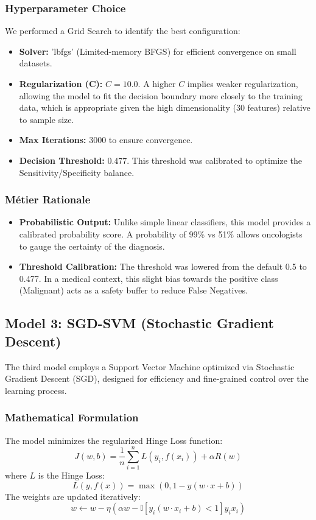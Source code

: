 \subsubsection{Hyperparameter Choice}
We performed a Grid Search to identify the best configuration:
\begin{itemize}
    \item \textbf{Solver:} 'lbfgs' (Limited-memory BFGS) for efficient convergence on small datasets.
    \item \textbf{Regularization (C):} $C=10.0$. A higher $C$ implies weaker regularization, allowing the model to fit the decision boundary more closely to the training data, which is appropriate given the high dimensionality (30 features) relative to sample size.
    \item \textbf{Max Iterations:} 3000 to ensure convergence.
    \item \textbf{Decision Threshold:} $0.477$. This threshold was calibrated to optimize the Sensitivity/Specificity balance.
\end{itemize}

\subsubsection{Métier Rationale}
\begin{itemize}
    \item \textbf{Probabilistic Output:} Unlike simple linear classifiers, this model provides a calibrated probability score. A probability of 99\% vs 51\% allows oncologists to gauge the certainty of the diagnosis.
    \item \textbf{Threshold Calibration:} The threshold was lowered from the default 0.5 to 0.477. In a medical context, this slight bias towards the positive class (Malignant) acts as a safety buffer to reduce False Negatives.
\end{itemize}

\subsection{Model 3: SGD-SVM (Stochastic Gradient Descent)}
The third model employs a Support Vector Machine optimized via Stochastic Gradient Descent (SGD), designed for efficiency and fine-grained control over the learning process.

\subsubsection{Mathematical Formulation}
The model minimizes the regularized Hinge Loss function:
\begin{equation}
    J(w,b) = \frac{1}{n} \sum_{i=1}^{n} L(y_i, f(x_i)) + \alpha R(w)
\end{equation}
where $L$ is the Hinge Loss:
\begin{equation}
    L(y, f(x)) = \max(0, 1 - y(w \cdot x + b))
\end{equation}
The weights are updated iteratively:
\begin{equation}
    w \leftarrow w - \eta \left( \alpha w - \mathbb{I}[y_i(w \cdot x_i + b) < 1] y_i x_i \right)
\end{equation}

